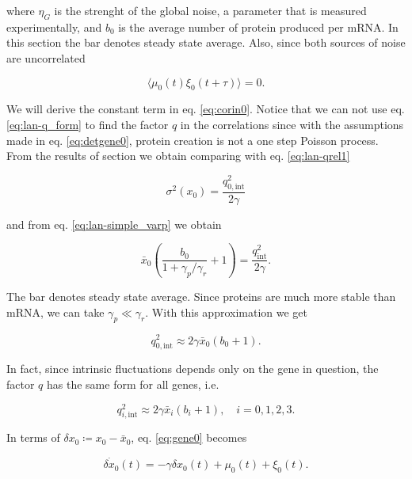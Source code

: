 where $\eta_G$ is the strenght of the global noise, a parameter that is measured experimentally, and $b_0$ is the average number of protein produced per mRNA. In this section the bar denotes steady state average. Also, since both sources of noise are uncorrelated

\begin{equation}
\label{eq:corinex0}
\langle\mu_0(t)\xi_0(t+\tau)\rangle = 0.
\end{equation}


We will derive the constant term in eq. \eqref{eq:corin0}. Notice that we can not use eq. \eqref{eq:lan-q_form} to find the factor $q$ in the correlations since with the assumptions made in eq. \eqref{eq:detgene0}, protein creation is not a one step Poisson process. From the results of section \label{sec:lan-single} we obtain comparing with eq. \eqref{eq:lan-qrel1}

\begin{equation*}
  \sigma^2(x_0) = \frac{q_{0,\text{int}}^2}{2\gamma}
\end{equation*}

and from eq. \eqref{eq:lan-simple_varp} we obtain

\begin{equation*}
  \bar{x}_0\left(\frac{b_0}{1+\gamma_p/\gamma_r}+1\right) = \frac{q_\text{int}^2}{2\gamma}.
\end{equation*}

The bar denotes steady state average. Since proteins are much more stable than mRNA, we can take $\gamma_p\ll\gamma_r$. With this approximation we get

\begin{equation*}
  q_{0,\text{int}}^2 \approx 2\gamma\bar{x}_0(b_0+1).
\end{equation*}

In fact, since intrinsic fluctuations depends only on the gene in question, the factor $q$ has the same form for all genes, i.e.

\begin{equation*}
  q_{i,\text{int}}^2 \approx 2\gamma\bar{x}_i(b_i+1),\quad i = 0,1,2,3.
\end{equation*}

In terms of $\delta x_0 \coloneqq x_0 - \bar{x}_0$, eq. \eqref{eq:gene0} becomes

\begin{equation}
\label{eq:dgene0}
\dot{\delta x_0}(t) = -\gamma \delta x_0(t) + \mu_0(t) + \xi_0(t).
\end{equation}

